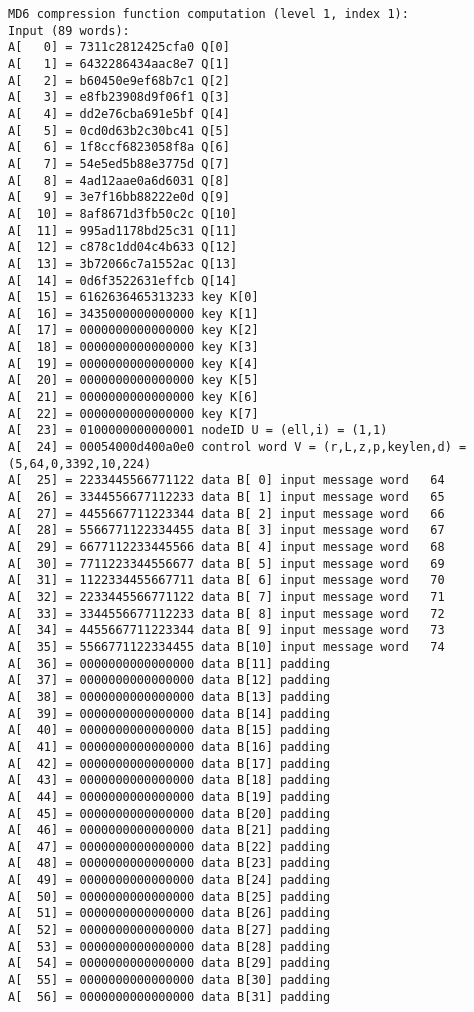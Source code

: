 \begin{verbatim}
MD6 compression function computation (level 1, index 1):
Input (89 words):
A[   0] = 7311c2812425cfa0 Q[0]
A[   1] = 6432286434aac8e7 Q[1]
A[   2] = b60450e9ef68b7c1 Q[2]
A[   3] = e8fb23908d9f06f1 Q[3]
A[   4] = dd2e76cba691e5bf Q[4]
A[   5] = 0cd0d63b2c30bc41 Q[5]
A[   6] = 1f8ccf6823058f8a Q[6]
A[   7] = 54e5ed5b88e3775d Q[7]
A[   8] = 4ad12aae0a6d6031 Q[8]
A[   9] = 3e7f16bb88222e0d Q[9]
A[  10] = 8af8671d3fb50c2c Q[10]
A[  11] = 995ad1178bd25c31 Q[11]
A[  12] = c878c1dd04c4b633 Q[12]
A[  13] = 3b72066c7a1552ac Q[13]
A[  14] = 0d6f3522631effcb Q[14]
A[  15] = 6162636465313233 key K[0]
A[  16] = 3435000000000000 key K[1]
A[  17] = 0000000000000000 key K[2]
A[  18] = 0000000000000000 key K[3]
A[  19] = 0000000000000000 key K[4]
A[  20] = 0000000000000000 key K[5]
A[  21] = 0000000000000000 key K[6]
A[  22] = 0000000000000000 key K[7]
A[  23] = 0100000000000001 nodeID U = (ell,i) = (1,1)
A[  24] = 00054000d400a0e0 control word V = (r,L,z,p,keylen,d) = (5,64,0,3392,10,224)
A[  25] = 2233445566771122 data B[ 0] input message word   64
A[  26] = 3344556677112233 data B[ 1] input message word   65
A[  27] = 4455667711223344 data B[ 2] input message word   66
A[  28] = 5566771122334455 data B[ 3] input message word   67
A[  29] = 6677112233445566 data B[ 4] input message word   68
A[  30] = 7711223344556677 data B[ 5] input message word   69
A[  31] = 1122334455667711 data B[ 6] input message word   70
A[  32] = 2233445566771122 data B[ 7] input message word   71
A[  33] = 3344556677112233 data B[ 8] input message word   72
A[  34] = 4455667711223344 data B[ 9] input message word   73
A[  35] = 5566771122334455 data B[10] input message word   74
A[  36] = 0000000000000000 data B[11] padding
A[  37] = 0000000000000000 data B[12] padding
A[  38] = 0000000000000000 data B[13] padding
A[  39] = 0000000000000000 data B[14] padding
A[  40] = 0000000000000000 data B[15] padding
A[  41] = 0000000000000000 data B[16] padding
A[  42] = 0000000000000000 data B[17] padding
A[  43] = 0000000000000000 data B[18] padding
A[  44] = 0000000000000000 data B[19] padding
A[  45] = 0000000000000000 data B[20] padding
A[  46] = 0000000000000000 data B[21] padding
A[  47] = 0000000000000000 data B[22] padding
A[  48] = 0000000000000000 data B[23] padding
A[  49] = 0000000000000000 data B[24] padding
A[  50] = 0000000000000000 data B[25] padding
A[  51] = 0000000000000000 data B[26] padding
A[  52] = 0000000000000000 data B[27] padding
A[  53] = 0000000000000000 data B[28] padding
A[  54] = 0000000000000000 data B[29] padding
A[  55] = 0000000000000000 data B[30] padding
A[  56] = 0000000000000000 data B[31] padding

\end{verbatim}

